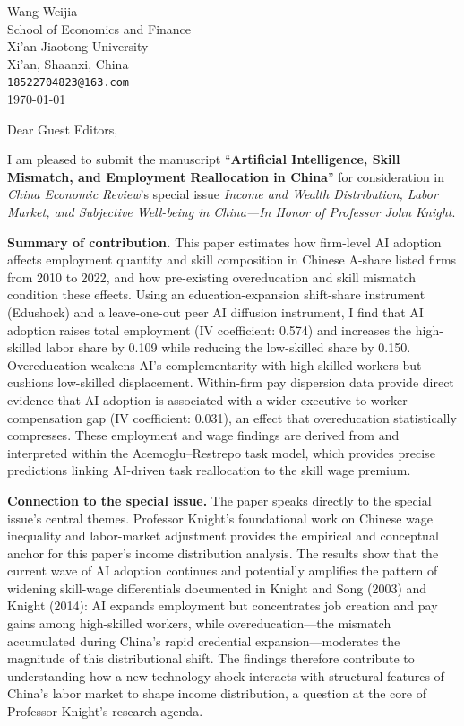 \documentclass[12pt,a4paper]{article}
\begin{document}
\begin{flushright}
Wang Weijia\\
School of Economics and Finance\\
Xi'an Jiaotong University\\
Xi'an, Shaanxi, China\\[0.3em]
\texttt{18522704823@163.com}\\[0.5em]
\today
\end{flushright}

\bigskip

Dear Guest Editors,

I am pleased to submit the manuscript ``\textbf{Artificial Intelligence, Skill Mismatch, and Employment Reallocation in China}'' for consideration in \textit{China Economic Review}'s special issue \textit{Income and Wealth Distribution, Labor Market, and Subjective Well-being in China---In Honor of Professor John Knight}.

\textbf{Summary of contribution.} This paper estimates how firm-level AI adoption affects employment quantity and skill composition in Chinese A-share listed firms from 2010 to 2022, and how pre-existing overeducation and skill mismatch condition these effects. Using an education-expansion shift-share instrument (Edushock) and a leave-one-out peer AI diffusion instrument, I find that AI adoption raises total employment (IV coefficient: 0.574) and increases the high-skilled labor share by 0.109 while reducing the low-skilled share by 0.150. Overeducation weakens AI's complementarity with high-skilled workers but cushions low-skilled displacement. Within-firm pay dispersion data provide direct evidence that AI adoption is associated with a wider executive-to-worker compensation gap (IV coefficient: 0.031), an effect that overeducation statistically compresses. These employment and wage findings are derived from and interpreted within the Acemoglu--Restrepo task model, which provides precise predictions linking AI-driven task reallocation to the skill wage premium.

\textbf{Connection to the special issue.} The paper speaks directly to the special issue's central themes. Professor Knight's foundational work on Chinese wage inequality and labor-market adjustment provides the empirical and conceptual anchor for this paper's income distribution analysis. The results show that the current wave of AI adoption continues and potentially amplifies the pattern of widening skill-wage differentials documented in Knight and Song (2003) and Knight (2014): AI expands employment but concentrates job creation and pay gains among high-skilled workers, while overeducation---the mismatch accumulated during China's rapid credential expansion---moderates the magnitude of this distributional shift. The findings therefore contribute to understanding how a new technology shock interacts with structural features of China's labor market to shape income distribution, a question at the core of Professor Knight's research agenda.
\end{document}
